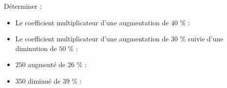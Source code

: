 \documentclass{beamer}
\begin{document}
\begin{frame}
	Déterminer :
		\begin{itemize}
			\item Le coefficient multiplicateur d'une augmentation de $40$ \% :
			\item Le coefficient multiplicateur d'une augmentation de $30$ \% suivie d'une diminution de $50$ \% :
			\item $250$ augmenté de $26$ \% :
			\item $350$ diminué de $39$ \% :
		\end{itemize}
\end{frame}
\end{document}
